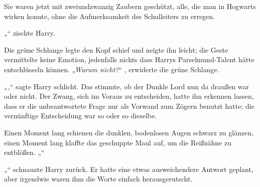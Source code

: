 Sie waren jetzt mit zweiundzwanzig Zaubern geschützt, alle, die man in Hogwarts wirken konnte, ohne die Aufmerksamkeit des Schulleiters zu erregen.

„“ zischte Harry.

Die grüne Schlange legte den Kopf schief und neigte ihn leicht; die Geste vermittelte keine Emotion, jedenfalls nichts dass Harrys Parselmund-Talent hätte entschlüsseln können. \emph{„Warum nicht?}“ , erwiderte die grüne Schlange.

„,“ sagte Harry schlicht. Das stimmte, ob der Dunkle Lord nun da draußen war oder nicht. Der Zwang, sich im Voraus zu entscheiden, hatte ihn erkennen lassen, dass er die unbeantwortete Frage nur als Vorwand zum Zögern benutzt hatte; die vernünftige Entscheidung war so oder so dieselbe.

Einen Moment lang schienen die dunklen, bodenlosen Augen schwarz zu glänzen, einen Moment lang klaffte das geschuppte Maul auf, um die Reißzähne zu entblößen. „“

„“ schnauzte Harry zurück. Er hatte eine etwas ausweichendere Antwort geplant, aber irgendwie waren ihm die Worte einfach herausgerutscht.

